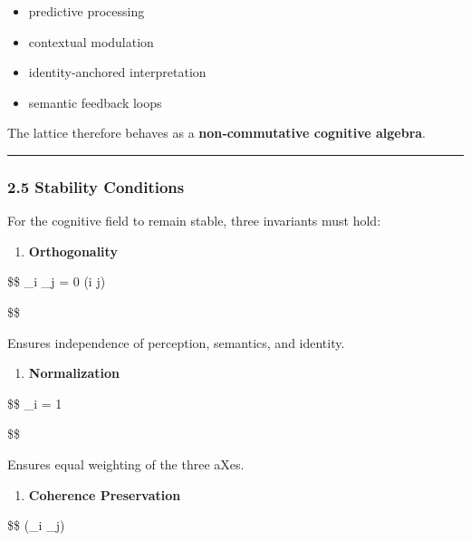 \begin{itemize}
\tightlist
\item
  predictive processing\\
\item
  contextual modulation\\
\item
  identity‑anchored interpretation\\
\item
  semantic feedback loops
\end{itemize}

The lattice therefore behaves as a \textbf{non‑commutative cognitive algebra}.

\begin{center}\rule{0.5\linewidth}{0.5pt}\end{center}

\subsubsection{2.5 Stability Conditions}\label{stability-conditions}

For the cognitive field to remain stable, three invariants must hold:

\begin{enumerate}
\def\labelenumi{\arabic{enumi}.}
\tightlist
\item
  \textbf{Orthogonality}
\end{enumerate}

\$\$ \_i \cdot {}\_j = 0 \quad (i \neq j)

\$\$

Ensures independence of perception, semantics, and identity.

\begin{enumerate}
\def\labelenumi{\arabic{enumi}.}
\setcounter{enumi}{1}
\tightlist
\item
  \textbf{Normalization}
\end{enumerate}

\$\$ \textbar{}\_i\textbar{} = 1

\$\$

Ensures equal weighting of the three aXes.

\begin{enumerate}
\def\labelenumi{\arabic{enumi}.}
\setcounter{enumi}{2}
\tightlist
\item
  \textbf{Coherence Preservation}
\end{enumerate}

\$\$ \Phi(\_i \otimes {}\_j) 

